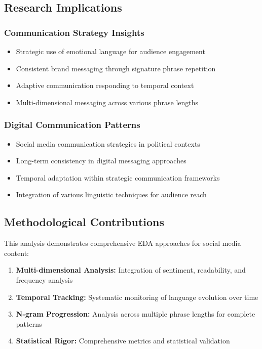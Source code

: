 \documentclass[12pt,a4paper]{article}
\begin{document}
\subsection{Research Implications}

\subsubsection{Communication Strategy Insights}
\begin{itemize}
\item Strategic use of emotional language for audience engagement
\item Consistent brand messaging through signature phrase repetition  
\item Adaptive communication responding to temporal context
\item Multi-dimensional messaging across various phrase lengths
\end{itemize}

\subsubsection{Digital Communication Patterns}
\begin{itemize}
\item Social media communication strategies in political contexts
\item Long-term consistency in digital messaging approaches
\item Temporal adaptation within strategic communication frameworks
\item Integration of various linguistic techniques for audience reach
\end{itemize}

\subsection{Methodological Contributions}

This analysis demonstrates comprehensive EDA approaches for social media content:

\begin{enumerate}
\item \textbf{Multi-dimensional Analysis:} Integration of sentiment, readability, and frequency analysis
\item \textbf{Temporal Tracking:} Systematic monitoring of language evolution over time
\item \textbf{N-gram Progression:} Analysis across multiple phrase lengths for complete patterns
\item \textbf{Statistical Rigor:} Comprehensive metrics and statistical validation
\end{enumerate}
\end{document}
